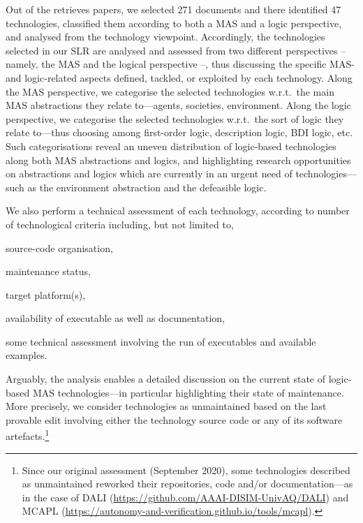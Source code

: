 \documentclass[12pt,a4paper,openright,twoside]{book}
\begin{document}
%
Out of the retrieves papers, we selected 271 documents and there identified 47 technologies, classified them according to both a MAS and a logic perspective, and analysed from the technology viewpoint.
%
Accordingly, the technologies selected in our SLR are analysed and assessed from two different perspectives -- namely, the MAS and the logical perspective --, thus discussing the specific MAS- and logic-related aspects defined, tackled, or exploited by each technology.
%
Along the MAS perspective, we categorise the selected technologies w.r.t.\ the main MAS abstractions they relate to---agents, societies, environment.
%
Along the logic perspective, we categorise the selected technologies w.r.t.\ the sort of logic they relate to---thus choosing among first-order logic, description logic, BDI logic, etc.
%
Such categorisations reveal an uneven distribution of logic-based technologies along both MAS abstractions and logics, and highlighting research opportunities on abstractions and logics which are currently in an urgent need of technologies---such as the environment abstraction and the defeasible logic.

We also perform a technical assessment of each technology, according to number of technological criteria including, but not limited to,
%
\begin{inlinelist}
    \item source-code organisation,
    \item maintenance status,
    \item target platform(s),
    \item availability of executable as well as documentation,
    \item some technical assessment involving the run of executables and available examples.
\end{inlinelist}
%
Arguably, the analysis enables a detailed discussion on the current state of logic-based MAS technologies---in particular highlighting their state of maintenance.
%
More precisely, we consider technologies as unmaintained based on the last provable edit involving either the technology source code or any of its software artefacts.\footnote{Since our original assessment (September 2020), some technologies described as unmaintained reworked their repositories, code and/or documentation---as in the case of DALI (\url{https://github.com/AAAI-DISIM-UnivAQ/DALI}) and MCAPL (\url{https://autonomy-and-verification.github.io/tools/mcapl}).}

\end{document}
